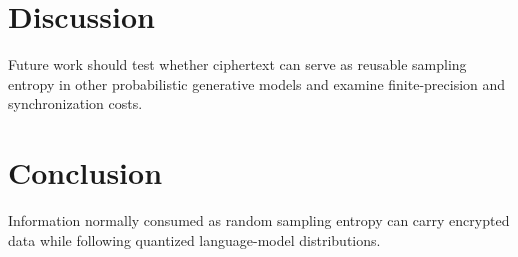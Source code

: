 \documentclass[10pt]{article}
\begin{document}
\section{Discussion}
Future work should test whether ciphertext can serve as reusable sampling
entropy in other probabilistic generative models and examine finite-precision
and synchronization costs.

\section{Conclusion}
Information normally consumed as random sampling entropy can carry encrypted
data while following quantized language-model distributions.
\end{document}
